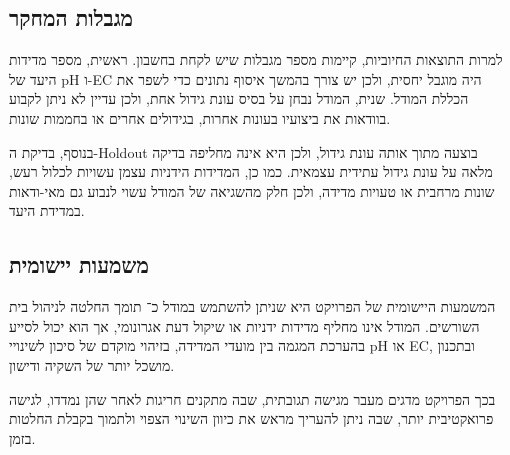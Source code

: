 \subsection{מגבלות המחקר}
למרות התוצאות החיוביות, קיימות מספר מגבלות שיש לקחת בחשבון. ראשית, מספר מדידות היעד של pH ו-EC היה מוגבל יחסית, ולכן יש צורך בהמשך איסוף נתונים כדי לשפר את הכללת המודל. שנית, המודל נבחן על בסיס עונת גידול אחת, ולכן עדיין לא ניתן לקבוע בוודאות את ביצועיו בעונות אחרות, בגידולים אחרים או בחממות שונות.

בנוסף, בדיקת ה-Holdout בוצעה מתוך אותה עונת גידול, ולכן היא אינה מחליפה בדיקה מלאה על עונת גידול עתידית עצמאית. כמו כן, המדידות הידניות עצמן עשויות לכלול רעש, שונות מרחבית או טעויות מדידה, ולכן חלק מהשגיאה של המודל עשוי לנבוע גם מאי-ודאות במדידת היעד.

\subsection{משמעות יישומית}
המשמעות היישומית של הפרויקט היא שניתן להשתמש במודל כ־\SoftSensor{} תומך החלטה לניהול בית השורשים. המודל אינו מחליף מדידות ידניות או שיקול דעת אגרונומי, אך הוא יכול לסייע בהערכת המגמה בין מועדי המדידה, בזיהוי מוקדם של סיכון לשינויי pH או EC, ובתכנון מושכל יותר של השקיה ודישון.

בכך הפרויקט מדגים מעבר מגישה תגובתית, שבה מתקנים חריגות לאחר שהן נמדדו, לגישה פרואקטיבית יותר, שבה ניתן להעריך מראש את כיוון השינוי הצפוי ולתמוך בקבלת החלטות בזמן.
